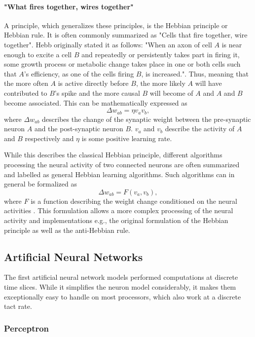 \paragraph{"What fires together, wires together"} \label{c:hebb}
A principle, which generalizes these principles, is the Hebbian principle or Hebbian rule.
It is often commonly summarized as "Cells that fire together, wire together".
Hebb originally stated it as follows: "When an axon of cell $A$ is near enough to excite a cell $B$ and repeatedly or persistently takes part in firing it, some growth process or metabolic change takes place in one or both cells such that $A$'s efficiency, as one of the cells firing $B$, is increased."\cite{hebb19680}.
Thus, meaning that the more often $A$ is active directly before $B$, the more likely $A$ will have contributed to $B$'s spike and the more causal $B$ will become of $A$ and $A$ and $B$ become associated.
This can be mathematically expressed as
\[
\Delta w_{ab} = \eta v_a v_b ,
\]
where $\Delta w_{ab}$ describes the change of the synaptic weight between the pre-synaptic neuron $A$ and the post-synaptic neuron $B$. 
$v_a$ and $v_b$ describe the activity of $A$ and $B$ respectively and $\eta$ is some positive learning rate. 

While this describes the classical Hebbian principle, different algorithms processing the neural activity of two connected neurons are often summarized and labelled as general Hebbian learning algorithms.
Such algorithms can in general be formalized as
\[
\Delta w_{ab} = F( v_a, v_b) , 
\]
where $F$ is a function describing the weight change conditioned on the neural activities \cite{gerstner2014neuronal}.     
This formulation allows a more complex processing of the neural activity and implementations e.g., the original formulation of the Hebbian principle as well as the anti-Hebbian rule. 

\subsection{Artificial Neural Networks} \label{c:ann}

The first artificial neural network models performed computations at discrete time slices.
While it simplifies the neuron model considerably, it makes them exceptionally easy to handle on most processors, which also work at a discrete tact rate.

\subsubsection{Perceptron} \label{c:perceptron}

